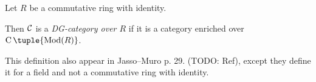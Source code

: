 \begin{definition}%
    Let \( R \) be a commutative ring with identity.

    Then \( {\mathcal{C}} \) is a \emph{DG-category over \( R \)} if it is a category enriched over \( \C \tuple{\Mod(R)} \).
\end{definition}
This definition also appear in Jasso--Muro p. 29. (TODO: Ref), except they define it for a field and not a commutative ring with identity.


    






